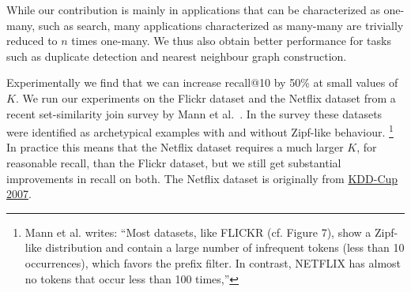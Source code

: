 While our contribution is mainly in applications that can be characterized as one-many, such as search, many applications characterized as many-many are trivially reduced to $n$ times one-many.
We thus also obtain better performance for tasks such as duplicate detection and nearest neighbour graph construction.

Experimentally we find that we can increase recall@10 by 50\% at small values of $K$.
We run our experiments on the Flickr dataset and the Netflix dataset from a recent set-similarity join survey by Mann et al.~\cite{mann2016empirical}.
In the survey these datasets were identified as archetypical examples with and without Zipf-like behaviour.
\footnote{Mann et al. writes:
 ``Most datasets, like FLICKR (cf. Figure 7), show a Zipf-like
 distribution and contain a large number of infrequent tokens (less
 than 10 occurrences), which favors the prefix filter. In contrast,
 NETFLIX has almost no tokens that occur less than 100 times,''
 }
In practice this means that the Netflix dataset requires a much larger $K$, for reasonable recall, than the Flickr dataset, but we still get substantial improvements in recall on both.
The Netflix dataset is originally from \href{https://www.cs.uic.edu/~liub/Netflix-KDD-Cup-2007.html}{KDD-Cup 2007}.



